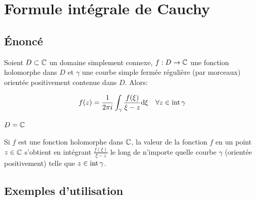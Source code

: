 \section{Formule intégrale de Cauchy}

\subsection{Énoncé}

\begin{theorem}
    Soient $D \subset \mathbb{C}$ un domaine simplement connexe, $f: D \rightarrow \mathbb{C}$ une fonction holomorphe dans $D$ et $\gamma$ une courbe simple fermée régulière (par morceaux) orientée positivement contenue dans $D$.
    Alors:
    
    \[
    f(z) = \frac{1}{2 \pi i} \int_\gamma \frac{f(\xi)}{\xi - z} \mathrm{d}\xi \quad \forall z \in \textrm{int}\, \gamma
    \]
\end{theorem}

\begin{illustration}
    $D = \mathbb{C}$
    
    Si $f$ est une fonction holomorphe dans $\mathbb{C}$, la valeur de la fonction $f$ en un point $z \in \mathbb{C}$ s'obtient en intégrant $\frac{f(\xi)}{\xi - z}$ le long de n'importe quelle courbe $\gamma$ (orientée positivement) telle que $z \in \textrm{int}\, \gamma$.
\end{illustration}

\subsection{Exemples d'utilisation}

